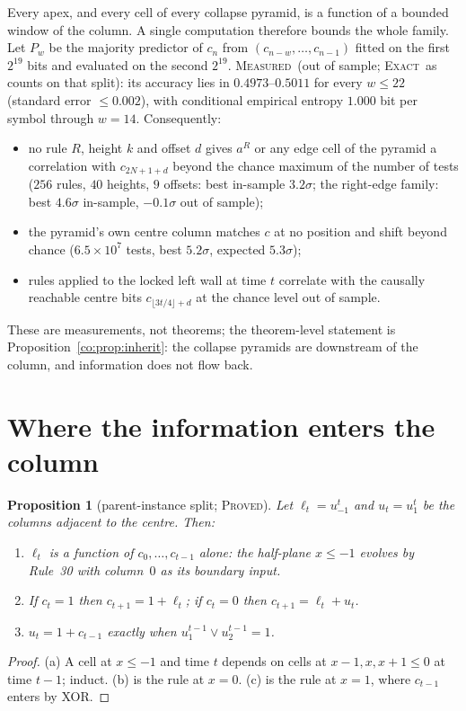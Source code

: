 \documentclass[11pt]{article}
\newtheorem{proposition}[theorem]{Proposition}
\theoremstyle{definition}
\theoremstyle{remark}
\newcommand{\PROVED}{\textsc{Proved}}
\newcommand{\EXACT}{\textsc{Exact}}
\newcommand{\MEASURED}{\textsc{Measured}}
\begin{document}
Every apex, and every cell of every collapse pyramid, is a function of a bounded window of the column.
A single computation therefore bounds the whole family. Let $P_w$ be the majority predictor of $c_n$ from
$(c_{n-w},\dots,c_{n-1})$ fitted on the first $2^{19}$ bits and evaluated on the second $2^{19}$.
\MEASURED\ (out of sample; \EXACT\ as counts on that split): its accuracy lies in $0.4973$--$0.5011$ for every $w\le 22$ (standard error $\le0.002$), with conditional empirical entropy
$1.000$ bit per symbol through $w=14$. Consequently:
\begin{itemize}
\item no rule $R$, height $k$ and offset $d$ gives $a^R$ or any edge cell of the pyramid a correlation with
$c_{2N+1+d}$ beyond the chance maximum of the number of tests ($256$ rules, $40$ heights, $9$ offsets:
best in-sample $3.2\sigma$; the right-edge family: best $4.6\sigma$ in-sample, $-0.1\sigma$ out of sample);
\item the pyramid's own centre column matches $c$ at no position and shift beyond chance ($6.5\times10^{7}$
tests, best $5.2\sigma$, expected $5.3\sigma$);
\item rules applied to the locked left wall at time $t$ correlate with the causally reachable centre bits
$c_{\lfloor 3t/4\rfloor+d}$ at the chance level out of sample.
\end{itemize}
These are measurements, not theorems; the theorem-level statement is Proposition~\ref{co:prop:inherit}:
the collapse pyramids are downstream of the column, and information does not flow back.


\section{Where the information enters the column}\label{co:split}

\begin{proposition}[parent-instance split; \PROVED]\label{co:parents}
Let $\ell_t=u^t_{-1}$ and $u_t=u^t_1$ be the columns adjacent to the centre. Then:
\begin{enumerate}[nosep]
\item[(a)] $\ell_t$ is a function of $c_0,\dots,c_{t-1}$ alone: the half-plane $x\le-1$ evolves by Rule~30 with column~$0$ as its boundary input.
\item[(b)] If $c_t=1$ then $c_{t+1}=1+\ell_t$; if $c_t=0$ then $c_{t+1}=\ell_t+u_t$.
\item[(c)] $u_{t}=1+c_{t-1}$ exactly when $u^{t-1}_1\vee u^{t-1}_2=1$.
\end{enumerate}
\end{proposition}
\begin{proof}
(a) A cell at $x\le-1$ and time $t$ depends on cells at $x-1,x,x+1\le0$ at time $t-1$; induct. (b) is the rule at $x=0$. (c) is the rule at $x=1$, where $c_{t-1}$ enters by XOR.
\end{proof}
\end{document}
